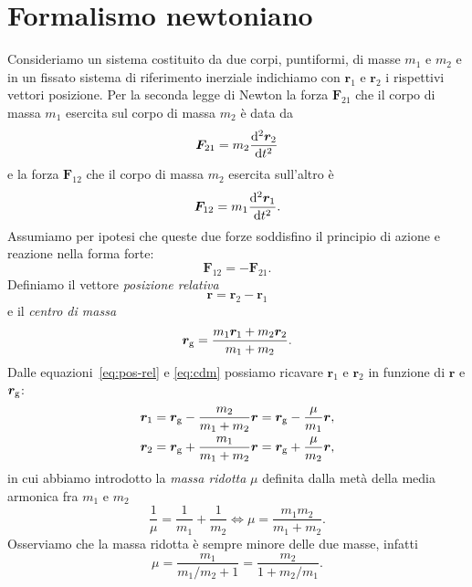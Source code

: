 \section{Formalismo newtoniano}
\label{sec:formalismo-newton}
Consideriamo un sistema costituito da due corpi, puntiformi, di masse $m_1$ e
$m_2$ e in un fissato sistema di riferimento inerziale indichiamo con $\bm{r}_1$
e $\bm{r}_2$ i rispettivi vettori posizione. Per la seconda legge di Newton la
forza $\bm{F}_{21}$ che il corpo di massa $m_1$ esercita sul corpo di massa
$m_2$ è data da
\begin{equation}
  \label{eq:f21}
  \bm{F}_{21} = m_2\toder[2]{\bm{r}_2}{t}
\end{equation}
e la forza $\bm{F}_{12}$ che il corpo di massa $m_2$ esercita sull'altro è
\begin{equation}
  \label{eq:f12}
  \bm{F}_{12} = m_1\toder[2]{\bm{r}_1}{t}.
\end{equation}
Assumiamo per ipotesi che queste due forze soddisfino il principio di azione e
reazione nella forma forte:
\begin{equation}
  \label{eq:az-reaz}
  \bm{F}_{12} = -\bm{F}_{21}.
\end{equation}
Definiamo il vettore \emph{posizione relativa}
\begin{equation}
  \label{eq:pos-rel}
  \bm{r}=\bm{r}_2-\bm{r}_1
\end{equation}
e il \emph{centro di massa}
\begin{equation}
  \label{eq:cdm}
  \bm{r}_\textup{g} = \frac{m_1\bm{r}_1+m_2\bm{r}_2}{m_1+m_2}.
\end{equation}
Dalle equazioni~\eqref{eq:pos-rel} e \eqref{eq:cdm} possiamo ricavare $\bm{r}_1$
e $\bm{r}_2$ in funzione di $\bm{r}$ e $\bm{r}_\textup{g}$:
\begin{align}
  \bm{r}_1 &= \bm{r}_\textup{g} - \frac{m_2}{m_1+m_2}\bm{r} = \bm{r}_\textup{g} -
  \frac{\mu}{m_1}\bm{r},\\
  \bm{r}_2 &= \bm{r}_\textup{g} + \frac{m_1}{m_1+m_2}\bm{r} = \bm{r}_\textup{g} +
  \frac{\mu}{m_2}\bm{r},
\end{align}
in cui abbiamo introdotto la \emph{massa ridotta} $\mu$ definita dalla metà
della media armonica fra $m_1$ e $m_2$
\begin{equation}
  \frac{1}{\mu} = \frac{1}{m_1} + \frac{1}{m_2} \iff \mu=\frac{m_1m_2}{m_1+m_2}.
\end{equation}
Osserviamo che la massa ridotta è sempre minore delle due masse, infatti
\begin{equation}
  \mu =\frac{m_1}{m_1/m_2+1} = \frac{m_2}{1+m_2/m_1}.
\end{equation}
